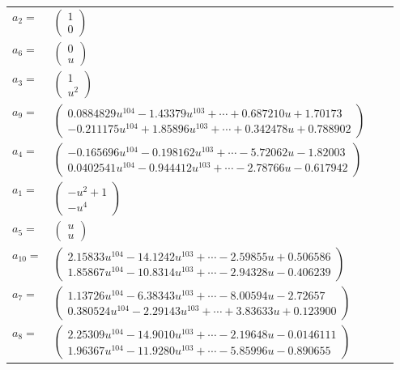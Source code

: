 \documentclass[1p]{elsarticle_modified}
\theoremstyle{definition}
\begin{document}
\begin{tabular}{m{7pt} m{180pt} m{7pt} m{180pt} }
\flushright $a_{2}=$&$\begin{pmatrix}1\\0\end{pmatrix}$ \\
\flushright $a_{6}=$&$\begin{pmatrix}0\\u\end{pmatrix}$ \\
\flushright $a_{3}=$&$\begin{pmatrix}1\\u^2\end{pmatrix}$ \\
\flushright $a_{9}=$&$\begin{pmatrix}0.0884829 u^{104}-1.43379 u^{103}+\cdots+0.687210 u+1.70173\\-0.211175 u^{104}+1.85896 u^{103}+\cdots+0.342478 u+0.788902\end{pmatrix}$ \\
\flushright $a_{4}=$&$\begin{pmatrix}-0.165696 u^{104}-0.198162 u^{103}+\cdots-5.72062 u-1.82003\\0.0402541 u^{104}-0.944412 u^{103}+\cdots-2.78766 u-0.617942\end{pmatrix}$ \\
\flushright $a_{1}=$&$\begin{pmatrix}- u^2+1\\- u^4\end{pmatrix}$ \\
\flushright $a_{5}=$&$\begin{pmatrix}u\\u\end{pmatrix}$ \\
\flushright $a_{10}=$&$\begin{pmatrix}2.15833 u^{104}-14.1242 u^{103}+\cdots-2.59855 u+0.506586\\1.85867 u^{104}-10.8314 u^{103}+\cdots-2.94328 u-0.406239\end{pmatrix}$ \\
\flushright $a_{7}=$&$\begin{pmatrix}1.13726 u^{104}-6.38343 u^{103}+\cdots-8.00594 u-2.72657\\0.380524 u^{104}-2.29143 u^{103}+\cdots+3.83633 u+0.123900\end{pmatrix}$ \\
\flushright $a_{8}=$&$\begin{pmatrix}2.25309 u^{104}-14.9010 u^{103}+\cdots-2.19648 u-0.0146111\\1.96367 u^{104}-11.9280 u^{103}+\cdots-5.85996 u-0.890655\end{pmatrix}$ \\

\end{tabular}
\end{document}
